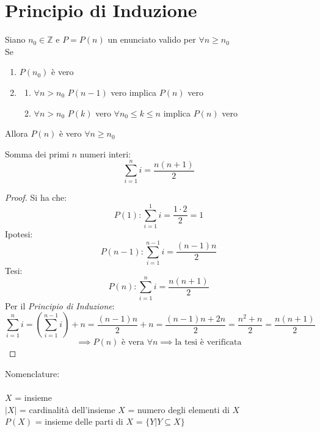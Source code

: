 \documentclass[a4paper,12pt, oneside]{book}
\begin{document}
\section{Principio di Induzione}
	\begin{principio}
		Siano $n_0 \in \mathbb{Z}$ e $P=P(n)$ un enunciato valido per $\forall n \geq n_0$\\
		Se \begin{enumerate}
			\item $P(n_0)$ è vero 
			\item \begin{enumerate}[label=\Roman*) ]
				\item $\forall n > n_0$ $P(n-1)$ vero implica $P(n)$ vero
				\item $\forall n > n_0$ $P(k)$ vero $\forall n_0 \leq k \leq n$ implica $P(n)$ vero
			\end{enumerate}
		\end{enumerate}
		Allora $P(n)$ è vero $\forall n \geq n_0$
	\end{principio}
	\begin{shaded}
		\begin{esempio}
			Somma dei primi $n$ numeri interi:
			\begin{equation}
			\sum_{i=1}^{n} i=\frac{n(n+1)}{2}
			\end{equation}
			\begin{proof}
				Si ha che:
				$$P(1): \sum_{i=1}^{1} i = \frac{1 \cdot 2}{2} = 1$$
				Ipotesi:
				$$P(n-1): \sum_{i=1}^{n-1} i = \frac{(n-1)n}{2}$$
				Tesi:
				$$P(n): \sum_{i=1}^{n} i = \frac{n(n+1)}{2}$$
				Per il \textit{Principio di Induzione}:
				$$ \sum_{i=1}^{n} i = (\sum_{i=1}^{n-1} i) + n = \frac{(n-1)n}{2} + n = \frac{(n-1)n + 2n}{2} = \frac{n^2 + n}{2} = \frac{n(n+1)}{2}$$
				$$ \implies P(n) \mbox{ è vera } \forall n \implies \mbox{la tesi è verificata}$$
			\end{proof}
		\end{esempio}
	\end{shaded}
	\begin{shaded}
		\begin{nota}
			Nomenclature: \\\\
			$X$ = insieme \\
			$|X|$ = cardinalità dell'insieme $X$ = numero degli elementi di $X$ \\
			$P(X)$ = insieme delle parti di $X$ = $\{ Y | Y \subseteq X \}$ 
		\end{nota}
	\end{shaded}
\end{document}
